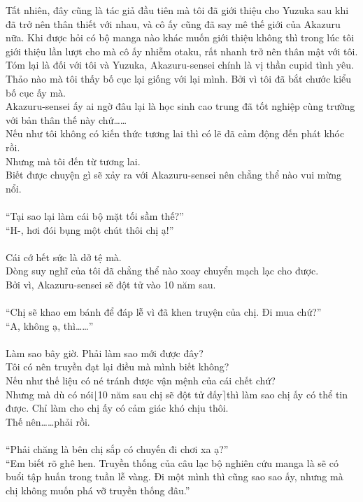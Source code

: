 \documentclass[12pt,a4paper, twosides]{book}
\begin{document}
Tất nhiên, đây cũng là tác giả đầu tiên mà tôi đã giới thiệu cho Yuzuka sau khi đã trở nên thân thiết với nhau, và cô ấy cũng đã say mê thế giới của Akazuru nữa. Khi được hỏi có bộ manga nào khác muốn giới thiệu không thì trong lúc tôi giới thiệu lần lượt cho mà cô ấy nhiễm otaku, rất nhanh trở nên thân mật với tôi. Tóm lại là đối với tôi và Yuzuka, Akazuru-sensei chính là vị thần cupid tình yêu.\\
Thảo nào mà tôi thấy bố cục lại giống với lại mình. Bởi vì tôi đã bắt chước kiểu bố cục ấy mà.\\
Akazuru-sensei ấy ai ngờ đâu lại là học sinh cao trung đã tốt nghiệp cùng trường với bản thân thế này chứ……\\
Nếu như tôi không có kiến thức tương lai thì có lẽ đã cảm động đến phát khóc rồi.\\
Nhưng mà tôi đến từ tương lai.\\
Biết được chuyện gì sẽ xảy ra với Akazuru-sensei nên chẳng thể nào vui mừng nổi.\\
\\
“Tại sao lại làm cái bộ mặt tối sầm thế?”\\
“H-, hơi đói bụng một chút thôi chị ạ!”\\
\\
Cái cớ hết sức là dở tệ mà.\\
Dòng suy nghĩ của tôi đã chẳng thể nào xoay chuyển mạch lạc cho được.\\
Bởi vì, Akazuru-sensei sẽ đột tử vào 10 năm sau.\\
\\
“Chị sẽ khao em bánh để đáp lễ vì đã khen truyện của chị. Đi mua chứ?”\\
“A, không ạ, thì……”\\
\\
Làm sao bây giờ. Phải làm sao mới được đây?\\
Tôi có nên truyền đạt lại điều mà mình biết không?\\
Nếu như thế liệu có né tránh được vận mệnh của cái chết chứ?\\
Nhưng mà dù có nói$\lfloor$10 năm sau chị sẽ đột tử đấy$\rceil$thì làm sao chị ấy có thể tin được. Chỉ làm cho chị ấy có cảm giác khó chịu thôi.\\
Thế nên……phải rồi.\\
\\
“Phải chăng là bên chị sắp có chuyến đi chơi xa ạ?”\\
“Em biết rõ ghê hen. Truyền thống của câu lạc bộ nghiên cứu manga là sẽ có buổi tập huấn trong tuần lễ vàng. Đi một mình thì cũng sao sao ấy, nhưng mà chị không muốn phá vỡ truyền thống đâu.”\\
\end{document}
